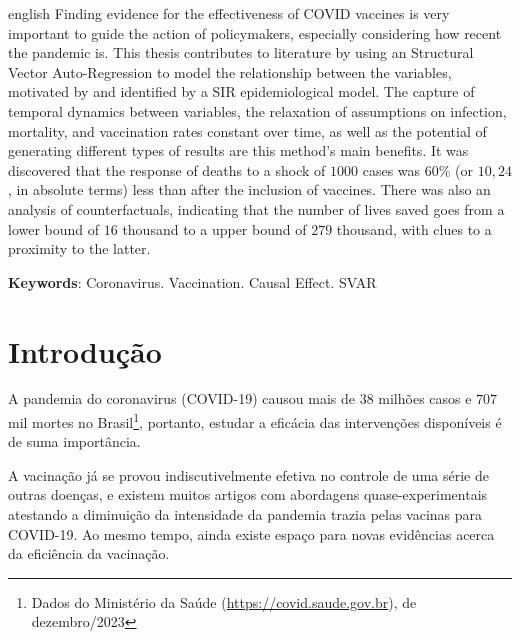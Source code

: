 \documentclass[
    article,
	12pt,				%
	oneside,			%
	a4paper,			%
	english,			%
	brazil,				%
	hyperref = {colorlinks, citecolor=c1d, linkcolor=c2d, urlcolor=c3d, colorlinks}
	]{abntex2}
\newcounter{j}
\begin{document}
\newpage
\begin{resumo}[Abstract]
\begin{otherlanguage*}{english}
   Finding evidence for the effectiveness of COVID vaccines is very important to guide the action of policymakers, especially considering how recent the pandemic is. This thesis contributes to literature by using an Structural Vector Auto-Regression to model the relationship between the variables, motivated by and identified by a SIR epidemiological model. The capture of temporal dynamics between variables, the relaxation of assumptions on infection, mortality, and vaccination rates constant over time, as well as the potential of generating different types of results are this method’s main benefits. It was discovered that the response of deaths to a shock of $1000$ cases was $60$\% (or $10,24$, in absolute terms) less than after the inclusion of vaccines. There was also an analysis of counterfactuals, indicating that the number of lives saved goes from a lower bound of $16$ thousand to a upper bound of $279$ thousand, with clues to a proximity to the latter.

   \vspace{\onelineskip}
 
   \noindent 
   \textbf{Keywords}: Coronavirus. Vaccination. Causal Effect. SVAR
\end{otherlanguage*}
\end{resumo}


\newpage
\tableofcontents*
\cleardoublepage


\textual
\pagestyle{plain} %

\chapter{Introdução}
A pandemia do coronavirus (COVID-19) causou mais de $38$ milhões casos e $707$ mil mortes no Brasil\footnote{Dados do Ministério da Saúde (\url{https://covid.saude.gov.br}), de dezembro/2023}, portanto, estudar a eficácia das intervenções disponíveis é de suma importância.

A vacinação já se provou indiscutivelmente efetiva no controle de uma série de outras doenças, e existem muitos artigos com abordagens quase-experimentais atestando a diminuição da intensidade da pandemia trazia pelas vacinas para COVID-19. Ao mesmo tempo, ainda existe espaço para novas evidências acerca da eficiência da vacinação.
\end{document}
